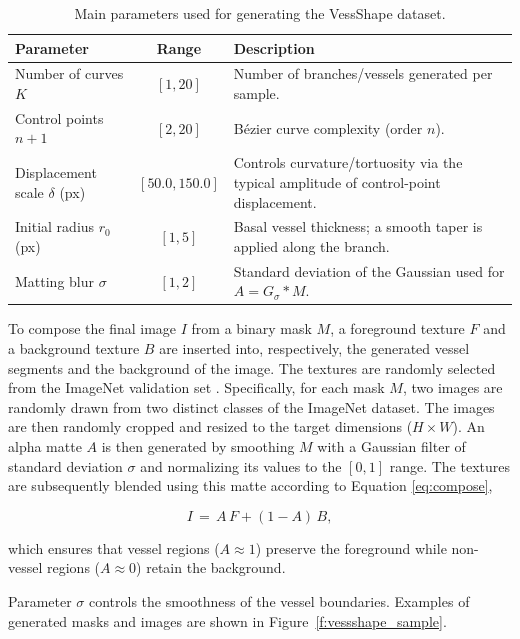 \documentclass[%
reprint,
nofootinbib,
 amsmath,amssymb,
aps,
superscriptaddress,
showkeys,
longbibliography
]{revtex4-1}
\begin{document}
\begin{table}[t]
\caption{Main parameters used for generating the VessShape dataset.}
\label{tab:vessshape_params}
\centering
\begin{tabularx}{\textwidth}{l c X}
\hline
    \textbf{Parameter} & \textbf{Range} & \textbf{Description} \\
\hline
Number of curves $K$ & $[1,20]$ & Number of branches/vessels generated per sample. \\
Control points $n{+}1$ & $[2,20]$ & Bézier curve complexity (order $n$). \\
Displacement scale $\delta$ (px) & $[50.0,150.0]$ & Controls curvature/tortuosity via the typical amplitude of control-point displacement. \\
Initial radius $r_{0}$ (px) & $[1,5]$ & Basal vessel thickness; a smooth taper is applied along the branch. \\
Matting blur $\sigma$ & $[1,2]$ & Standard deviation of the Gaussian used for $A = G_{\sigma} * M$. \\

\hline
\end{tabularx}
\end{table}

To compose the final image $I$ from a binary mask $M$, a foreground texture $F$ and a background texture $B$ are inserted into, respectively, the generated vessel segments and the background of the image. The textures are randomly selected from the ImageNet validation set \cite{JiaDeng2009}. Specifically, for each mask $M$, two images are randomly drawn from two distinct classes of the ImageNet dataset. The images are then randomly cropped and resized to the target dimensions ($H \times W$). An alpha matte $A$ is then generated by smoothing $M$ with a Gaussian filter of standard deviation $\sigma$ and normalizing its values to the $[0, 1]$ range. The textures are subsequently blended using this matte according to Equation \ref{eq:compose},

\begin{equation}
I \,=\, A\,F + (1-A)\,B,
\label{eq:compose}
\end{equation}

which ensures that vessel regions ($A \approx 1$) preserve the foreground while non-vessel regions ($A \approx 0$) retain the background. 

Parameter $\sigma$ controls the smoothness of the vessel boundaries. Examples of generated masks and images are shown in Figure~\ref{f:vessshape_sample}.
\end{document}
